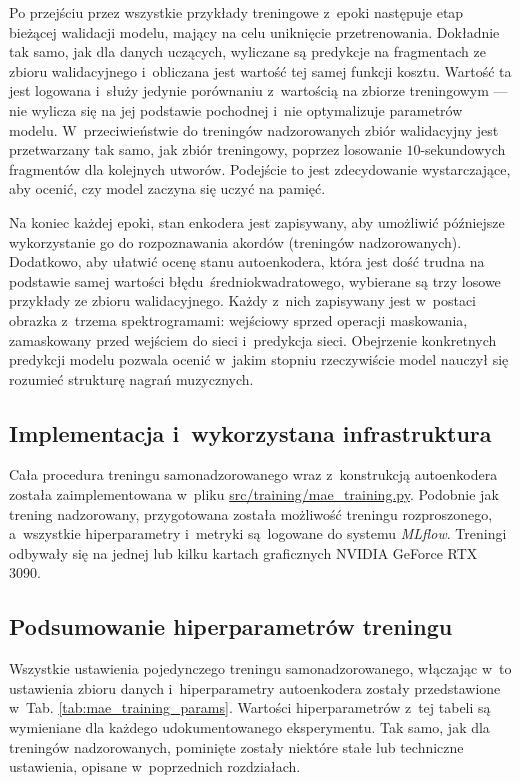 Po przejściu przez wszystkie przykłady treningowe z~epoki następuje etap bieżącej walidacji modelu, mający na celu uniknięcie przetrenowania. Dokładnie tak samo, jak dla danych uczących, wyliczane są predykcje na fragmentach ze zbioru walidacyjnego i~obliczana jest wartość tej samej funkcji kosztu.  Wartość ta jest logowana i~służy jedynie porównaniu z~wartością na zbiorze treningowym --- nie wylicza się na jej podstawie pochodnej i~nie optymalizuje parametrów modelu. W~przeciwieństwie do treningów nadzorowanych zbiór walidacyjny jest przetwarzany tak samo, jak zbiór treningowy, poprzez losowanie $10$-sekundowych fragmentów dla kolejnych utworów. Podejście to jest zdecydowanie wystarczające, aby ocenić, czy model zaczyna się uczyć na pamięć.

Na koniec każdej epoki, stan enkodera jest zapisywany, aby umożliwić późniejsze wykorzystanie go do rozpoznawania akordów (treningów nadzorowanych). Dodatkowo, aby ułatwić ocenę stanu autoenkodera, która jest dość trudna na podstawie samej wartości błędu średniokwadratowego, wybierane są trzy losowe przykłady ze zbioru walidacyjnego. Każdy z~nich zapisywany jest w~postaci obrazka z~trzema spektrogramami: wejściowy sprzed operacji maskowania, zamaskowany przed wejściem do sieci i~predykcja sieci. Obejrzenie konkretnych predykcji modelu pozwala ocenić w~jakim stopniu rzeczywiście model nauczył się rozumieć strukturę nagrań muzycznych.

\subsection{Implementacja i~wykorzystana infrastruktura}

Cała procedura treningu samonadzorowanego wraz z~konstrukcją autoenkodera została zaimplementowana w~pliku \url{src/training/mae_training.py}. Podobnie jak trening nadzorowany, przygotowana została możliwość treningu rozproszonego, a~wszystkie hiperparametry i~metryki są logowane do systemu \emph{MLflow}. Treningi odbywały się na jednej lub kilku kartach graficznych NVIDIA GeForce RTX 3090.

\subsection{Podsumowanie hiperparametrów treningu}

Wszystkie ustawienia pojedynczego treningu samonadzorowanego, włączając w~to ustawienia zbioru danych i~hiperparametry autoenkodera zostały przedstawione w~Tab. \ref{tab:mae_training_params}.  Wartości hiperparametrów z~tej tabeli są wymieniane dla każdego udokumentowanego eksperymentu. Tak samo, jak dla treningów nadzorowanych, pominięte zostały niektóre stałe lub techniczne ustawienia, opisane w~poprzednich rozdziałach. 

